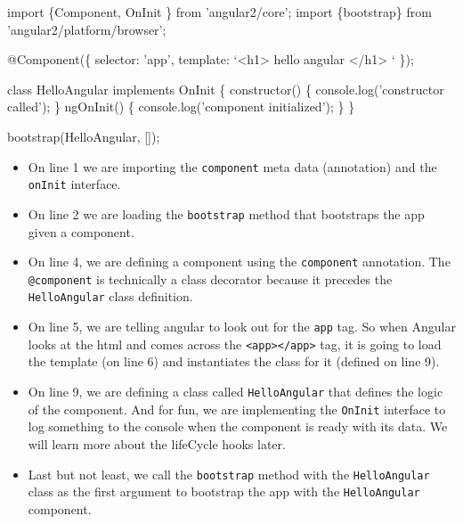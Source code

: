 \documentclass[12pt,]{article}
\newenvironment{Shaded}{}{}
\newcommand{\KeywordTok}[1]{\textcolor[rgb]{0.00,0.00,1.00}{{#1}}}
\newcommand{\FunctionTok}[1]{{#1}}
\newcommand{\NormalTok}[1]{{#1}}
\providecommand{\tightlist}{%
  \setlength{\itemsep}{0pt}\setlength{\parskip}{0pt}}
\begin{document}
\begin{Shaded}
\begin{Highlighting}[numbers=left,,]
\KeywordTok{import \{Component, OnInit \} from 'angular2/core';}
\KeywordTok{import \{bootstrap\} from 'angular2/platform/browser';}

\FunctionTok{@Component}\NormalTok{(\{}
  \NormalTok{selector: 'app',}
  \NormalTok{template: `<h1> hello angular </h1> `}
\NormalTok{\});}

\KeywordTok{class} \NormalTok{HelloAngular }\KeywordTok{implements} \NormalTok{OnInit  \{}
  \FunctionTok{constructor}\NormalTok{() \{ console.}\FunctionTok{log}\NormalTok{('constructor called'); \}}
  \FunctionTok{ngOnInit}\NormalTok{() \{ console.}\FunctionTok{log}\NormalTok{('component initialized'); \}}
\NormalTok{\}}

\FunctionTok{bootstrap}\NormalTok{(HelloAngular, []);}
\end{Highlighting}
\end{Shaded}

\begin{itemize}
\tightlist
\item
  On line 1 we are importing the \texttt{component} meta data
  (annotation) and the \texttt{onInit} interface.
\item
  On line 2 we are loading the \texttt{bootstrap} method that bootstraps
  the app given a component.
\item
  On line 4, we are defining a component using the \texttt{component}
  annotation. The \texttt{@component} is technically a class decorator
  because it precedes the \texttt{HelloAngular} class definition.
\item
  On line 5, we are telling angular to look out for the \texttt{app}
  tag. So when Angular looks at the html and comes across the
  \texttt{\textless{}app\textgreater{}\textless{}/app\textgreater{}}
  tag, it is going to load the template (on line 6) and instantiates the
  class for it (defined on line 9).
\item
  On line 9, we are defining a class called \texttt{HelloAngular} that
  defines the logic of the component. And for fun, we are implementing
  the \texttt{OnInit} interface to log something to the console when the
  component is ready with its data. We will learn more about the
  lifeCycle hooks later.
\item
  Last but not least, we call the \texttt{bootstrap} method with the
  \texttt{HelloAngular} class as the first argument to bootstrap the app
  with the \texttt{HelloAngular} component.
\end{itemize}
\end{document}
